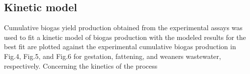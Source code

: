 \subsection{Kinetic model}
Cumulative biogas yield production obtained from the experimental assays was used to fit a kinetic model of biogas production with the modeled results for the best fit are plotted against the experimental cumulative biogas production in Fig.4, Fig.5, and Fig.6 for gestation, fattening, and weaners wastewater, respectively.
Concerning the kinetics of the process